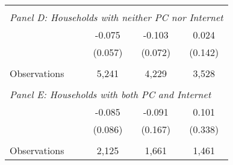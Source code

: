 {\begin{tabular}{lccc}
&  &  &   \\
\multicolumn{4}{l}{\textit{Panel D: Households with neither PC nor Internet}} \\
\hspace{3mm}        &      -0.075   &      -0.103   &       0.024   \\
                    &     (0.057)   &     (0.072)   &     (0.142)   \\
                    &               &               &               \\
\hspace{3mm}Observations&       5,241   &       4,229   &       3,528   \\
 
&  &  &   \\
\multicolumn{4}{l}{\textit{Panel E: Households with both PC and Internet}} \\
\hspace{3mm}        &      -0.085   &      -0.091   &       0.101   \\
                    &     (0.086)   &     (0.167)   &     (0.338)   \\
                    &               &               &               \\
\hspace{3mm}Observations&       2,125   &       1,661   &       1,461   \\
 

\bottomrule
\end{tabular}
}
